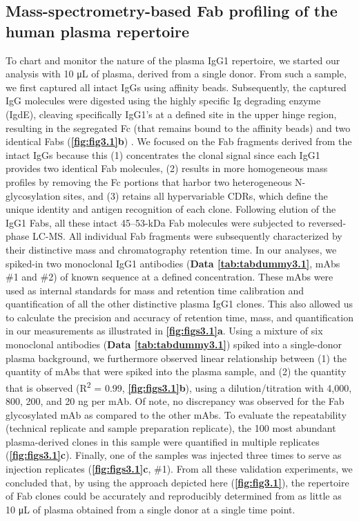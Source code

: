 \subsection{Mass-spectrometry-based Fab profiling of the human plasma repertoire}
To chart and monitor the nature of the plasma IgG1 repertoire, we started our analysis with 10 μL of plasma, derived from a single donor. From such a sample, we first captured all intact IgGs using affinity beads. Subsequently, the captured IgG molecules were digested using the highly specific Ig degrading enzyme (IgdE), cleaving specifically IgG1’s at a defined site in the upper hinge region, resulting in the segregated Fc (that remains bound to the affinity beads) and two identical Fabs (\textbf{\autoref{fig:fig3.1}b}) \cite{spoerry2016novel}. We focused on the Fab fragments derived from the intact IgGs because this (1) concentrates the clonal signal since each IgG1 provides two identical Fab molecules, (2) results in more homogeneous mass profiles by removing the Fc portions that harbor two heterogeneous N-glycosylation sites, and (3) retains all hypervariable CDRs, which define the unique identity and antigen recognition of each clone.
Following elution of the IgG1 Fabs, all these intact 45–53-kDa Fab molecules were subjected to reversed-phase LC-MS. All individual Fab fragments were subsequently characterized by their distinctive mass and chromatography retention time. In our analyses, we spiked-in two monoclonal IgG1 antibodies (\textbf{Data \ref{tab:tabdummy3.1}}, mAbs \#1 and \#2) of known sequence at a defined concentration. These mAbs were used as internal standards for mass and retention time calibration and quantification of all the other distinctive plasma IgG1 clones. This also allowed us to calculate the precision and accuracy of retention time, mass, and quantification in our measurements as illustrated in \textbf{\autoref{fig:figs3.1}a}.
Using a mixture of six monoclonal antibodies (\textbf{Data \ref{tab:tabdummy3.1}}) spiked into a single-donor plasma background, we furthermore observed linear relationship between (1) the quantity of mAbs that were spiked into the plasma sample, and (2) the quantity that is observed (R\textsuperscript{2} = 0.99, \textbf{\autoref{fig:figs3.1}b}), using a dilution/titration with 4,000, 800, 200, and 20 ng per mAb. Of note, no discrepancy was observed for the Fab glycosylated mAb as compared to the other mAbs. To evaluate the repeatability (technical replicate and sample preparation replicate), the 100 most abundant plasma-derived clones in this sample were quantified in multiple replicates (\textbf{\autoref{fig:figs3.1}c}). Finally, one of the samples was injected three times to serve as injection replicates (\textbf{\autoref{fig:figs3.1}c}, \#1). From all these validation experiments, we concluded that, by using the approach depicted here (\textbf{\autoref{fig:fig3.1}}), the repertoire of Fab clones could be accurately and reproducibly determined from as little as 10 μL of plasma obtained from a single donor at a single time point.

